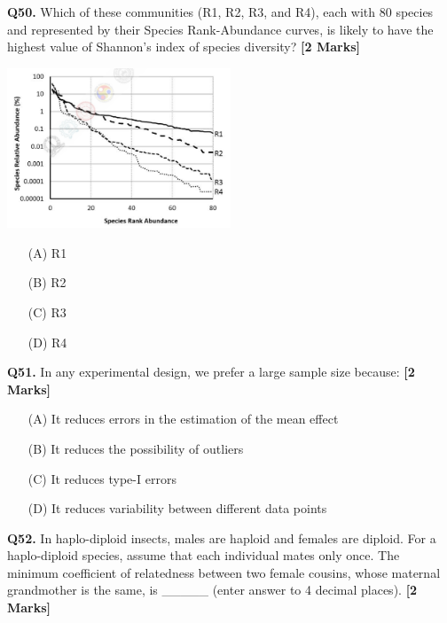 \documentclass[11pt]{article}
\newcommand{\questionb}[2]{
    \noindent\textbf{Q#2.} #1 \hfill \textbf{[2 Marks]}
}
\begin{document}
\questionb{Which of these communities (R1, R2, R3, and R4), each with 80 species and represented by their Species Rank-Abundance curves, is likely to have the highest value of Shannon's index of species diversity?}{50}
\begin{center}
\includegraphics[width=0.5\textwidth]{figures/50.png}
\end{center}
\begin{enumerate}
    \item[(A)] R1  
    \item[(B)] R2  
    \item[(C)] R3  
    \item[(D)] R4  
\end{enumerate}
\vspace{0.5cm}

\questionb{In any experimental design, we prefer a large sample size because:}{51}
\begin{enumerate}
    \item[(A)] It reduces errors in the estimation of the mean effect  
    \item[(B)] It reduces the possibility of outliers  
    \item[(C)] It reduces type-I errors  
    \item[(D)] It reduces variability between different data points  
\end{enumerate}
\vspace{0.5cm}

\questionb{In haplo-diploid insects, males are haploid and females are diploid. For a haplo-diploid species, assume that each individual mates only once. The minimum coefficient of relatedness between two female cousins, whose maternal grandmother is the same, is \_\_\_\_\_ (enter answer to 4 decimal places).}{52}
\vspace{0.5cm}
\end{document}
